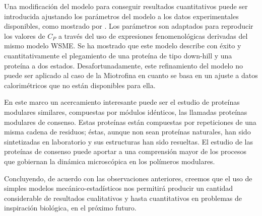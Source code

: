 Una modificación del modelo para conseguir resultados cuantitativos puede ser
introducida ajustando los parámetros del modelo a los datos experimentales
disponibles, como mostrado por \citet{Bruscolini2011}.
Los parámetros son adaptados para reproducir los valores de $C_P$ a través del
uso de expresiones fenomenológicas derivadas del mismo modelo WSME.
Se ha mostrado que este modelo describe con éxito y cuantitativamente el plegamiento de una
proteína de tipo down-hill y una proteína a dos estados\cite{Bruscolini2011}.
Desafortunadamente, este refinamiento del modelo no puede ser aplicado al caso
de la Miotrofina en cuanto se basa en un ajuste a datos calorimétricos que no están
disponibles para ella.

En este marco un acercamiento interesante puede ser el estudio de proteínas
modulares similares, compuestas por módulos idénticos, las llamadas proteínas
modulares de consenso.
Estas proteínas están compuestas por repeticiones de una misma cadena de
residuos; éstas, aunque non sean proteínas naturales, han sido sintetizadas en
laboratorio y sus estructuras han sido resueltas.
El estudio de las proteínas de consenso puede aportar a una comprensión mayor de
los procesos que gobiernan la dinámica microscópica en los polímeros modulares.

Concluyendo, de acuerdo con las observaciones anteriores, creemos que el uso de
simples modelos mecánico-estadísticos nos permitirá producir un cantidad
considerable de resultados cualitativos y hasta cuantitativos 
en problemas de inspiración biológica, en el próximo futuro.
